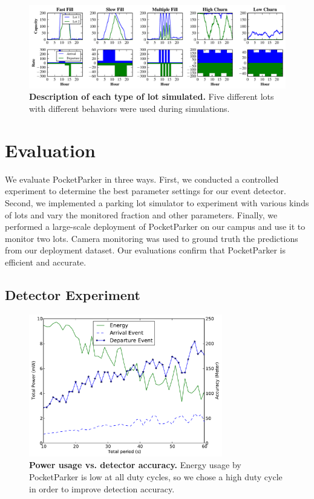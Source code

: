 \begin{figure}[t]
\centering
\includegraphics[width=\textwidth]{./simulator/figures/lots.pdf}

\caption{\textbf{Description of each type of lot simulated.} Five different
lots with different behaviors were used during simulations.}

\label{fig-lotsdescription}
\end{figure}

\section{Evaluation}
\label{sec-evaluation}

We evaluate PocketParker in three ways. First, we conducted a controlled
experiment to determine the best parameter settings for our event detector.
Second, we implemented a parking lot simulator to experiment with various
kinds of lots and vary the monitored fraction and other parameters. Finally,
we performed a large-scale deployment of PocketParker on our campus and use
it to monitor two lots. Camera monitoring was used to ground truth the
predictions from our deployment dataset. Our evaluations confirm that
PocketParker is efficient and accurate.

\subsection{Detector Experiment}

\begin{figure}[t]
\centering
\includegraphics[width=3.325in]{./figures/Energy_accuracy.pdf}

\caption{\textbf{Power usage vs. detector accuracy.} Energy usage by
PocketParker is low at all duty cycles, so we chose a high duty cycle in
order to improve detection accuracy.}

\label{fig-energy}
\end{figure}

